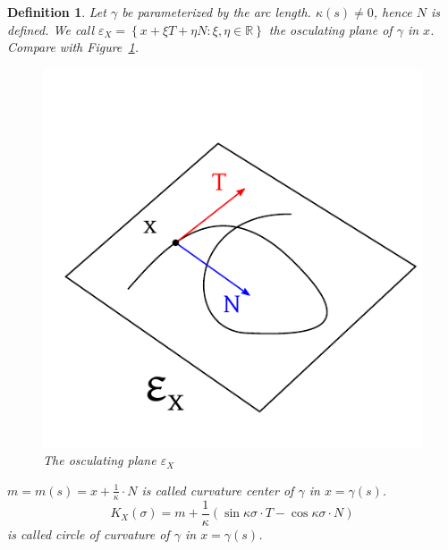 \documentclass{article}
\newtheorem{definition}{Definition}  \numberwithin{definition}{section}
\newcommand{\set}[1]{\left\{#1\right\}}
\begin{document}
\begin{definition} %
  Let $\gamma$ be parameterized by the arc length.
  $\kappa(s) \neq 0$, hence $N$ is defined. We call $\varepsilon_X = \set{x + \xi T + \eta N: \xi, \eta \in \mathbb R}$
  the \emph{osculating plane} of $\gamma$ in $x$. Compare with Figure~\ref{img:oscplane}.

  \begin{figure}[t]
    \begin{center}
      \includegraphics{img/51_osculating_plane.pdf}
      \caption{The osculating plane $\varepsilon_X$}
      \label{img:oscplane}
    \end{center}
  \end{figure}

  $m = m(s) = x + \frac{1}{\kappa} \cdot N$ is called curvature center of $\gamma$ in $x = \gamma(s)$.
  \[ K_X(\sigma) = m + \frac{1}{\kappa} (\sin{\kappa \sigma \cdot T} - \cos{\kappa \sigma \cdot N}) \]
  is called \emph{circle of curvature of $\gamma$ in $x = \gamma(s)$}.
\end{definition}
\end{document}
